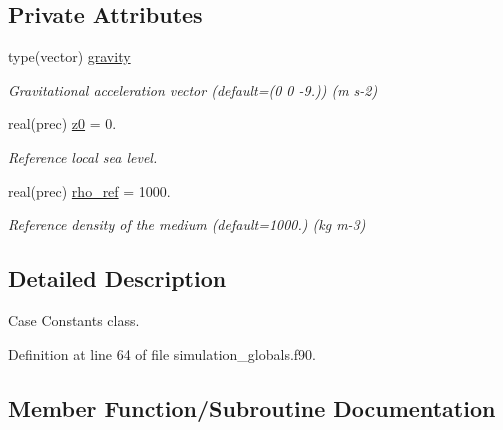 \subsection*{Private Attributes}
\begin{DoxyCompactItemize}
\item 
type(vector) \mbox{\hyperlink{structsimulation__globals__mod_1_1constants__t_ab1d29ee73044e2bb7b47ca302e2cfdf9}{gravity}}
\begin{DoxyCompactList}\small\item\em Gravitational acceleration vector (default=(0 0 -\/9.)) (m s-\/2) \end{DoxyCompactList}\item 
real(prec) \mbox{\hyperlink{structsimulation__globals__mod_1_1constants__t_a737e824cf720aea683fe23939d12aa5b}{z0}} = 0.
\begin{DoxyCompactList}\small\item\em Reference local sea level. \end{DoxyCompactList}\item 
real(prec) \mbox{\hyperlink{structsimulation__globals__mod_1_1constants__t_a7e4a2bb5206340621bfce6792b527f6d}{rho\+\_\+ref}} = 1000.
\begin{DoxyCompactList}\small\item\em Reference density of the medium (default=1000.) (kg m-\/3) \end{DoxyCompactList}\end{DoxyCompactItemize}


\subsection{Detailed Description}
Case Constants class. 

Definition at line 64 of file simulation\+\_\+globals.\+f90.



\subsection{Member Function/\+Subroutine Documentation}
\mbox{\label{structsimulation__globals__mod_1_1constants__t_a920570af3904fb782a96d3765e314468}} 

